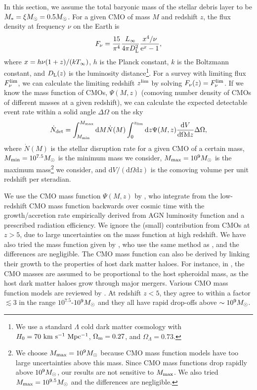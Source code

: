 \documentclass[useAMS,usenatbib]{mn2e}
\def\mt{\mathrm}
\begin{document}
In this section, we assume the total baryonic mass of the stellar
debris layer to be $M_* = \xi M_{\rm \odot} = 0.5 M_{\rm \odot}$. For
a given CMO of mass $M$ and redshift $z$, the flux density at
frequency $\nu$ on 
the Earth is
\begin{equation}
  \label{eq:17}
  F_\nu = \frac{15}{\pi^4} \frac{L_{\rm \infty}}{4\pi D_{\rm L}^2}
  \frac{x^4/\nu}{\mathrm{e}^x-1},
\end{equation}
where $x = h\nu(1+z)/(kT_{\rm \infty})$, $h$ is the Planck constant,
$k$ is the Boltzmann constant, and $D_{\rm L}(z)$ is the luminosity
distance\footnote{We use a
  standard $\Lambda$ cold dark matter cosmology with $H_{\rm 0} = 70
  \rm\ km\ s^{-1}\ Mpc^{-1}$, $\Omega_{\rm m} = 0.27$, and
  $\Omega_{\Lambda} = 0.73$.}. For a survey with limiting flux $F_\nu^{\rm 
  lim}$, we can calculate the limiting redshift $z^{\rm lim}$ by solving
$F_\nu(z) = F_\nu^{\rm lim}$. If we know the mass function of CMOs,
$\Psi(M, z)$ (comoving number density of CMOs of 
different masses at a given redshift), we can calculate the expected
detectable event rate within a solid angle 
$\Delta \Omega$ on the sky
\begin{equation}
  \label{eq:23}
  \dot{N}_{\rm det} = \int_{M_{\rm min}}^{M_{\rm max}}\mt{d} M \dot{N}(M) 
  \int_0^{z_{\rm lim}}\mt{d}z \Psi(M, z) \frac{\mt{d}V}{\mt{d}\Omega
    \mt{d} z} \Delta \Omega,
\end{equation}
where $\dot{N}(M)$ is the stellar disruption rate for a given CMO
of a certain mass, $M_{\rm min} = 10^{7.5}M_{\rm\odot}$ is the minimum
mass we consider, $M_{\rm max}=10^9M_{\rm \odot}$ is the maximum
mass\footnote{We choose $M_{\rm max}=10^9M_{\rm \odot}$ because CMO
  mass function models have too large uncertainties above this
  mass. Since CMO mass functions drop rapidly above
  $10^9M_{\rm \odot}$, our results are not sensitive to
  $M_{\rm max}$. We also tried $M_{\rm max}=10^{9.5}M_{\rm \odot}$ and
the differences are negligible.} we consider, and $\mt{d}V/(\mt{d}\Omega \mt{d} z)$ is the
comoving volume per unit redshift per steradian. 

We use the CMO mass function $\Psi(M,z)$ by
\citet{2009ApJ...690...20S}, who integrate from the low-redshift CMO mass
function backwards over cosmic time with the growth/accretion rate
empirically derived from AGN luminosity function and a prescribed
radiation efficiency. We ignore the (small) contribution from CMOs at
$z>5$, due to large uncertainties on the mass function at high
redshift. We have also tried the mass 
function given by \citet{2008MNRAS.388.1011M}, 
who use the same method as \citet{2009ApJ...690...20S}, and the
differences are negligible. The CMO mass function can also be derived by 
linking their growth to the properties of host dark matter haloes. For
instance, in \citet{2008ApJS..175..356H}, the CMO masses are assumed to be
proportional to the host spheroidal mass, as the host dark matter
haloes grow through major mergers. Various CMO mass function models
are reviewed by \citet{2012AdAst2012E...7K}. At redshift $z<5$, they
agree to within a factor $\lesssim 3$ in the range $10^{7.5}$-$10^{9}
M_{\rm\odot}$ and they all have rapid drop-offs above $\sim 10^{9}
M_{\rm\odot}$.
\end{document}
